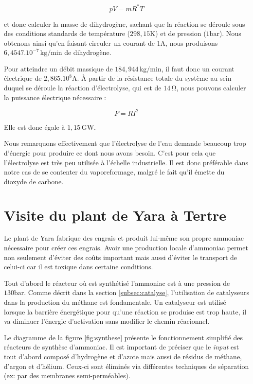\documentclass[a4paper, oneside, 12pt]{article}
\begin{document}
\begin{equation*}
	pV = mR^{*}T
\end{equation*}

et donc calculer la masse de dihydrogène, sachant que la réaction se déroule sous 
des conditions standards de température ($298,15 \si{\kelvin}$) et de pression ($1 \si{\bar}$).
Nous obtenons ainsi qu'en faisant circuler un courant de $1 \si{\ampere}$,
nous produisons $6,4547.10^{-7} \, \si{\kilo\gram/\minute}$ de dihydrogène.

Pour atteindre un débit massique de $184,944 \, \si{\kilo\gram/\minute}$,
il faut donc un courant électrique de $2,865.10^8 \si{\ampere}$. À partir de la résistance
totale du système au sein duquel se déroule la réaction d'électrolyse,
qui est de $14 \, \si{\ohm}$, nous pouvons calculer la puissance électrique nécessaire : 

\begin{equation*}
	P = RI^{2}
\end{equation*}

Elle est donc égale à $1,15 \, \si{\giga\watt}$.

Nous remarquons effectivement que l'électrolyse de l'eau demande beaucoup trop d'énergie
pour produire ce dont nous avons besoin. C'est pour cela que l'électrolyse est très peu 
utilisée à l'échelle industrielle. Il est donc préférable dans notre cas de se contenter
du vaporeformage, malgré le fait qu'il émette du dioxyde de carbone.

\section{Visite du plant de Yara à Tertre}

Le plant de Yara fabrique des engrais et produit lui-même son propre ammoniac nécessaire
pour créer ces engrais. Avoir une production locale d'ammoniac permet non seulement 
d'éviter des coûts important mais aussi d'éviter le transport de celui-ci car 
il est toxique dans certaine conditions.

Tout d'abord le réacteur où est synthétisé l'ammoniac est à une pression de $130 \si{\bar}$.
Comme décrit dans la section \ref{subsec:catalyse}, l'utilisation de catalyseurs dans la
production du méthane est fondamentale. Un catalyseur est utilisé lorsque la barrière 
énergétique pour qu'une réaction se produise est trop haute, il va diminuer l'énergie 
d'activation sans modifier le chemin réacionnel.

Le diagramme de la figure \ref{fig:synthese} présente le fonctionnement simplifié des 
réacteurs de synthèse d'ammoniac. Il est important de préciser que le \emph{input} est
tout d'abord composé d'hydrogène et d'azote mais aussi de résidus de méthane, d'argon 
et d'hélium. Ceux-ci sont éliminés via différentes techniques de séparation (ex: par 
des membranes semi-perméables). 
\end{document}
